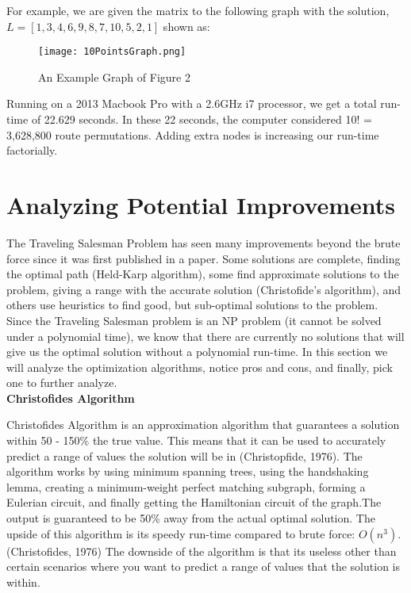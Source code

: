 \documentclass[a4paper,titlepage, margin, 11pt]{article}
\numberwithin{equation}{section}
\begin{document}
For example, we are given the matrix to the following graph with the solution, $L = [1, 3, 4, 6, 9, 8, 7, 10, 5, 2, 1]$ shown as:\\

\begin{figure}[h!]
\centering
\texttt{[image: 10PointsGraph.png]}
\caption{An Example Graph of Figure 2}
\label{fig:exGraph}
\end{figure}

\newpage

Running on a 2013 Macbook Pro with a 2.6GHz i7 processor, we get a total run-time of 22.629 seconds. In these 22 seconds, the computer considered 10! = 3,628,800 route permutations. Adding extra nodes is increasing our run-time factorially.

\section{Analyzing Potential Improvements}
The Traveling Salesman Problem has seen many improvements beyond the brute force since it was first published in a paper. Some solutions are complete, finding the optimal path (Held-Karp algorithm), some find approximate solutions to the problem, giving a range with the accurate solution (Christofide's algorithm), and others use heuristics to find good, but sub-optimal solutions to the problem. Since the Traveling Salesman problem is an NP problem (it cannot be solved under a polynomial time), we know that there are currently no solutions that will give us the optimal solution without a polynomial run-time. In this section we will analyze the optimization algorithms, notice pros and cons, and finally, pick one to further analyze.\\

\textbf{Christofides Algorithm}

Christofides Algorithm is an approximation algorithm that guarantees a solution within 50 - 150\% the true value. This means that it can be used to accurately predict a range of values the solution will be in (Christopfide, 1976). The algorithm works by using minimum spanning trees, using the handshaking lemma, creating a minimum-weight perfect matching subgraph, forming a Eulerian circuit, and finally getting the Hamiltonian circuit of the graph.The output is guaranteed to be 50\% away from the actual optimal solution. The upside of this algorithm is its speedy run-time compared to brute force: $O(n^3)$.(Christofides, 1976) The downside of the algorithm is that its useless other than certain scenarios where you want to predict a range of values that the solution is within. \\
\end{document}
